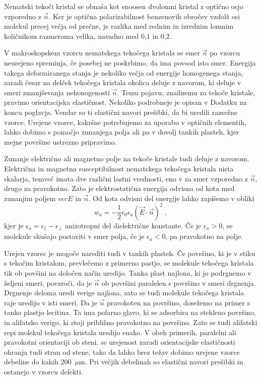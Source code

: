 \documentclass[11pt,fleqn]{book} %
\begin{document}
Nematski tekoči kristal se obnaša kot enoosen dvolomni kristal z optično
osjo vzporedno z $\vec{n}$. Ker je optična polarizabilnost benzenovih
obročev vzdolž osi molekul precej večja od prečne, je razlika med
rednim in izrednim lomnim količnikom razmeroma velika, navadno med
0,1 in 0,2.

V makroskopskem vzorcu nematskega tekočega kristala se smer $\vec{n}$
po vzorcu neurejeno spreminja, če posebej ne poskrbimo, da ima povsod
isto smer. Energija takega deformiranega stanja je nekoliko večja
od energije homogenega stanja, zaradi česar na delček tekočega kristala
okolica deluje z navorom, ki deluje v smeri zmanjševanja nehonogenosti
$\vec{n}$. Temu pojavu, zna\textquotedbl{}ilnemu za tekoče kristale,
pravimo orientacijska elastičnost. Nekoliko podrobneje je opisan v
Dodatku na koncu poglavja. Vendar so ti elastični navori prešibki,
da bi uredili razsežne vzorce. Urejene vzorce, kakršne potrebujemo
za uporabo v optičnih elementih, lahko dobimo s pomočjo zunanjega
polja ali pa v dovolj tankih plasteh, kjer mejne površine ustrezno
pripravimo.

Zunanje električno ali magnetno polje na tekoče kristale tudi deluje
z navorom. Električna in magnetna susceptibilnost nematskega tekočega
kristala nista skalarja, temveč imata dve različni lastni vrednosti,
eno v za smer vzporedno z $\vec{n}$, drugo za pravokotno. Zato je
elektrostatična energija odvisna od kota med zunanjim poljem $vec{E}$
in $\vec{n}$. Od kota odvisni del energije lahko zapišemo v obliki
\begin{equation}
w_{a}=-\frac{1}{2}\epsilon_{0}\epsilon_{a}(\vec{E}\cdot\vec{n})^{2}\;,\label{7.56}
\end{equation}
 kjer je $\epsilon_{a}=\epsilon_{\parallel}-\epsilon_{\perp}$ anizotropni
del dielektrične konstante. Če je $\epsilon_{a}>0$, se molekule skušajo
postaviti v smer polja, če je $\epsilon_{a}<0$, pa pravokotno na
polje.

Urejen vzorec je mogoče narediti tudi v tankih plasteh. Če površino,
ki je v stiku s tekočim kristalom, prevlečemo z primerno pastjo, se
molekule tekočega kristala tik ob povšini na določen način uredijo.
Tanka plast najlona, ki jo podrgnemo v željeni smeri, povzroči, da
je $\vec{n}$ ob površini paralelen s površino v smeri drgnenja. Drgnenje
deloma uredi verige najlona, zato se tudi molekule tekočega kristala
raje uredijo v isti smeri. Da je $\vec{n}$ pravokoten na površino,
dosežemo na primer s tanko plastjo lecitina. Ta ima polarno glavo,
ki se adsorbira na stekleno površino, in alifatsko verigo, ki stoji
približno pravokotno na površino. Zato se tudi alifatski repi molekul
tekočega kristala uredijo enako. V obeh primerih, paralelni ali pravokotni
orientaciji ob steni, se urejenost zaradi orientacijske elastičnosti
ohranja tudi stran od stene, tako da lahko brez težav dobimo urejene
vzorce debeline do kakih 200~$\mu$m. Pri večjih debelinah so elastični
navori prešibki in ostanejo v vzorcu defekti.
\end{document}
